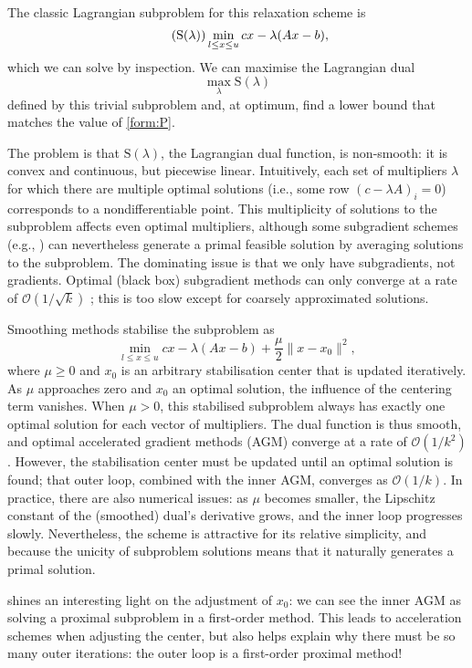 \documentclass{article}
\newcommand{\LeftEqNo}{\let\veqno\leqno}
\begin{document}
The classic Lagrangian subproblem for this relaxation scheme is
\begin{equation}\LeftEqNo
\tag{S$(\lambda)$} \min_{l\leq x\leq u} cx - \lambda(Ax-b),
\end{equation}
which we can solve by inspection.  We can maximise the Lagrangian
dual 
\[\max_{\lambda} \mathrm{S}(\lambda)\]
defined by this trivial subproblem and, at optimum, find a lower bound
that matches the value of \eqref{form:P}.

The problem is that \(\mathrm{S}(\lambda)\), the Lagrangian dual
function, is non-smooth: it is convex and continuous, but piecewise
linear.  Intuitively, each set of multipliers \(\lambda\) for which
there are multiple optimal solutions (i.e., some row \((c-\lambda
A)_i = 0\)) corresponds to a nondifferentiable point.  This
multiplicity of solutions to the subproblem affects even optimal
multipliers, although some subgradient schemes (e.g.,
\citep{Barahona:2000we}) can nevertheless generate a primal feasible
solution by averaging solutions to the subproblem.  The dominating
issue is that we only have subgradients, not gradients.  Optimal
(black box) subgradient methods can only converge at a rate of
\(\mathcal{O}(1/\sqrt{k})\) \citep{Goffin:1977kq}; this is too slow
except for coarsely approximated solutions.

Smoothing methods \citep{Nesterov:2005p2323,Nesterov:2007uz} stabilise
the subproblem as
\[\min_{l\leq x\leq u} cx - \lambda(Ax-b) + \frac{\mu}{2} \|x-x_0\|^2,\]
where \(\mu\geq 0\) and \(x_0\) is an arbitrary stabilisation center
that is updated iteratively.  As \(\mu\) approaches zero and \(x_0\)
an optimal solution, the influence of the centering term vanishes.
When \(\mu>0\), this stabilised subproblem always has exactly one
optimal solution for each vector of multipliers.  The dual function is
thus smooth, and optimal accelerated gradient methods (AGM) converge
at a rate of \(\mathcal{O}(1/k^2)\)
\citep{Nesterov:1983vi,Nesterov:2007wm,Gonzaga:2008wc}.  However, the
stabilisation center must be updated until an optimal solution is
found; that outer loop, combined with the inner AGM, converges as
\(\mathcal{O}(1/k)\).  In practice, there are also numerical issues:
as \(\mu\) becomes smaller, the Lipschitz constant of the (smoothed)
dual's derivative grows, and the inner loop progresses slowly.
Nevertheless, the scheme is attractive for its relative simplicity,
and because the unicity of subproblem solutions means that it
naturally generates a primal solution.

\citep{Becker:2011wg} shines an interesting light on the adjustment of
\(x_0\): we can see the inner AGM as solving a proximal subproblem in
a first-order method.  This leads to acceleration schemes when
adjusting the center, but also helps explain why there must be so many
outer iterations: the outer loop is a first-order proximal method!
\end{document}

